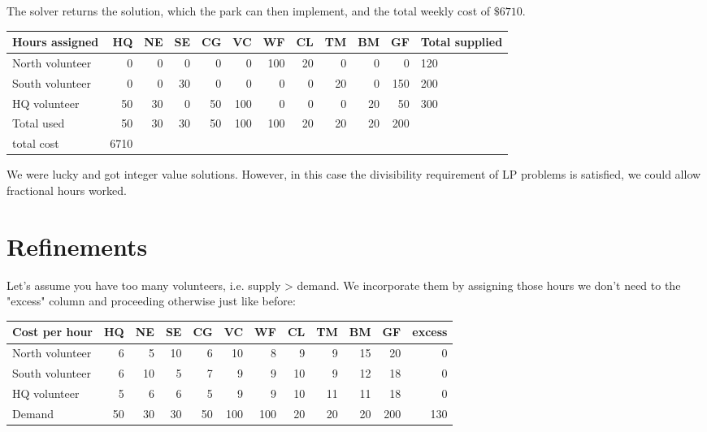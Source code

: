 The solver returns the solution, which the park can then implement, and the total weekly cost of $\$ 6710$.

\begin{center}
\begin{tabular}{|l|r|r|r|r|r|r|r|r|r|r|l|}
\hline
Hours assigned & HQ & NE & SE & CG & VC & WF & CL & TM & BM & GF & Total supplied \\
\hline
North volunteer & 0 & 0 & 0 & 0 & 0 & 100 & 20 & 0 & 0 & 0 & 120 \\
\hline
South volunteer & 0 & 0 & 30 & 0 & 0 & 0 & 0 & 20 & 0 & 150 & 200 \\
\hline
HQ volunteer & 50 & 30 & 0 & 50 & 100 & 0 & 0 & 0 & 20 & 50 & 300 \\
\hline
Total used & 50 & 30 & 30 & 50 & 100 & 100 & 20 & 20 & 20 & 200 &  \\
\hline
total cost & 6710 & \multicolumn{4}{|c|}{} &  &  &  &  &  &  \\
\hline
\end{tabular}
\end{center}

We were lucky and got integer value solutions. However, in this case the divisibility requirement of LP problems is satisfied, we could allow fractional hours worked.

\section*{Refinements}
Let's assume you have too many volunteers, i.e. supply > demand. We incorporate them by assigning those hours we don't need to the "excess" column and proceeding otherwise just like before:

\begin{center}
\begin{tabular}{|l|r|r|r|r|r|r|r|r|r|r|r|}
\hline
Cost per hour & \multicolumn{1}{l|}{HQ} & NE & \multicolumn{1}{l|}{SE} & CG & VC & WF & CL & TM & BM & GF & excess \\
\hline
North volunteer & 6 & 5 & 10 & 6 & 10 & 8 & 9 & 9 & 15 & 20 & 0 \\
\hline
South volunteer & 6 & 10 & 5 & 7 & 9 & 9 & 10 & 9 & 12 & 18 & 0 \\
\hline
HQ volunteer & 5 & 6 & 6 & 5 & 9 & 9 & 10 & 11 & 11 & 18 & 0 \\
\hline
Demand & 50 & 30 & 30 & 50 & 100 & 100 & 20 & 20 & 20 & 200 & 130 \\
\hline
\end{tabular}
\end{center}

